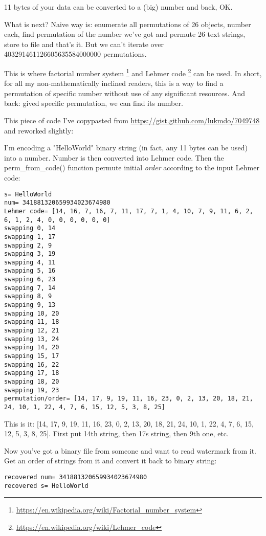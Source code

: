 11 bytes of your data can be converted to a (big) number and back, OK.

What is next?
Naive way is: enumerate all permutations of 26 objects, number each, find permutation of the number we've got and
permute 26 text strings, store to file and that's it.
But we can't iterate over 403291461126605635584000000 permutations.

This is where factorial number system
\footnote{\url{https://en.wikipedia.org/wiki/Factorial_number_system}}
and Lehmer code
\footnote{\url{https://en.wikipedia.org/wiki/Lehmer_code}}
can be used.
In short, for all my non-mathematically inclined readers, this is a way to find a permutation of specific number
without use of any significant resources.
And back: gived specific permutation, we can find its number.

This piece of code I've copypasted from \url{https://gist.github.com/lukmdo/7049748} and reworked slightly:



I'm encoding a "HelloWorld" binary string (in fact, any 11 bytes can be used) into a number.
Number is then converted into Lehmer code.
Then the perm\_from\_code() function permute initial \textit{order} according to the input Lehmer code:

\begin{lstlisting}
s= HelloWorld
num= 341881320659934023674980
Lehmer code= [14, 16, 7, 16, 7, 11, 17, 7, 1, 4, 10, 7, 9, 11, 6, 2, 6, 1, 2, 4, 0, 0, 0, 0, 0, 0]
swapping 0, 14
swapping 1, 17
swapping 2, 9
swapping 3, 19
swapping 4, 11
swapping 5, 16
swapping 6, 23
swapping 7, 14
swapping 8, 9
swapping 9, 13
swapping 10, 20
swapping 11, 18
swapping 12, 21
swapping 13, 24
swapping 14, 20
swapping 15, 17
swapping 16, 22
swapping 17, 18
swapping 18, 20
swapping 19, 23
permutation/order= [14, 17, 9, 19, 11, 16, 23, 0, 2, 13, 20, 18, 21, 24, 10, 1, 22, 4, 7, 6, 15, 12, 5, 3, 8, 25]
\end{lstlisting}

This is it: [14, 17, 9, 19, 11, 16, 23, 0, 2, 13, 20, 18, 21, 24, 10, 1, 22, 4, 7, 6, 15, 12, 5, 3, 8, 25].
First put 14th string, then 17s string, then 9th one, etc.

Now you've got a binary file from someone and want to read watermark from it.
Get an order of strings from it and convert it back to binary string:

\begin{lstlisting}
recovered num= 341881320659934023674980
recovered s= HelloWorld
\end{lstlisting}


